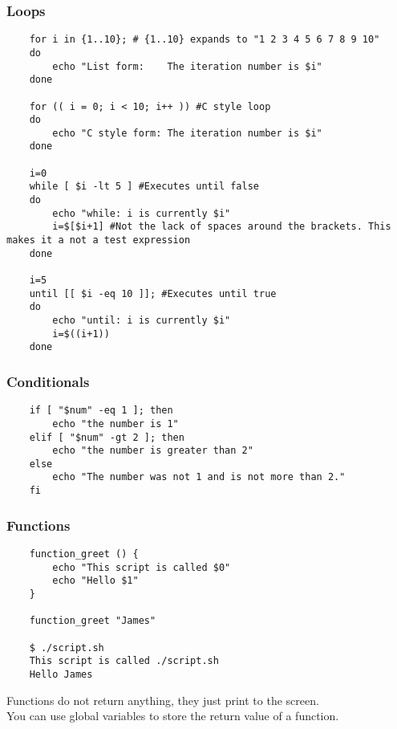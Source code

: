 \documentclass[12pt,a4paper]{article}
\begin{document}
\subsubsection{Loops}
\begin{lstlisting}
    for i in {1..10}; # {1..10} expands to "1 2 3 4 5 6 7 8 9 10"
    do 
        echo "List form:    The iteration number is $i"
    done

    for (( i = 0; i < 10; i++ )) #C style loop
    do
        echo "C style form: The iteration number is $i"
    done

    i=0
    while [ $i -lt 5 ] #Executes until false
    do
        echo "while: i is currently $i"
        i=$[$i+1] #Not the lack of spaces around the brackets. This makes it a not a test expression
    done

    i=5
    until [[ $i -eq 10 ]]; #Executes until true
    do
        echo "until: i is currently $i"
        i=$((i+1))
    done
\end{lstlisting}

\subsubsection{Conditionals}
\begin{lstlisting}
    if [ "$num" -eq 1 ]; then
        echo "the number is 1"
    elif [ "$num" -gt 2 ]; then
        echo "the number is greater than 2"
    else
        echo "The number was not 1 and is not more than 2."
    fi
\end{lstlisting}

\subsubsection{Functions}
\begin{lstlisting}
    function_greet () {
        echo "This script is called $0"
        echo "Hello $1"
    }

    function_greet "James"

    $ ./script.sh
    This script is called ./script.sh
    Hello James
\end{lstlisting}
Functions do not return anything, they just print to the screen.\\
You can use global variables to store the return value of a function.\\
\end{document}
